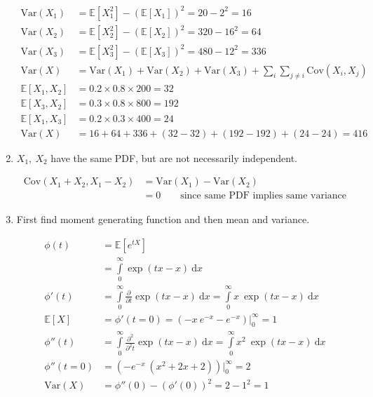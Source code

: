 \begin{enumerate}
		\begin{align}
			\mathrm{Var}(X_1) &= \mathbb{E}[X_1^2]- (\mathbb{E}[X_1])^2 = 20 - 2^2 = 16 \nonumber \\
			\mathrm{Var}(X_2) &= \mathbb{E}[X_2^2]- (\mathbb{E}[X_2])^2 = 320 - 16^2 = 64 \nonumber \\
			\mathrm{Var}(X_3) &= \mathbb{E}[X_3^2]- (\mathbb{E}[X_3])^2 = 480 - 12^2 = 336 \nonumber \\
			\mathrm{Var}(X) &= \mathrm{Var}(X_1) + \mathrm{Var}(X_2) + \mathrm{Var}(X_3) + \sum\limits_{i} \sum\limits_{j \neq i} \mathrm{Cov}(X_i, X_j)  \\
			\mathbb{E}[X_1, X_2] &= 0.2 \times 0.8 \times 200 = 32 \nonumber \\
			\mathbb{E}[X_3, X_2] &= 0.3 \times 0.8 \times 800 = 192 \nonumber \\
			\mathbb{E}[X_1, X_3] &= 0.2 \times 0.3 \times 400 = 24 \nonumber \\
			\mathrm{Var}(X) &= 16 + 64 + 336 + (32 - 32) + (192 - 192) + (24 - 24) = 416
		\end{align}
	
	
	\item $ X_1,\ X_2 $ have the same PDF, but are not necessarily independent.
	
		\begin{align}
			\mathrm{Cov}(X_1 + X_2, X_1 - X_2) &= \mathrm{Var}(X_1) - \mathrm{Var}(X_2) \nonumber \\
			&= 0 \qquad \text{since same PDF implies same variance}
		\end{align}
	
	
	\item First find moment generating function and then mean and variance.
	
		\begin{align}
			\phi (t) &= \mathbb{E}[e^{tX}] \nonumber \\
			&= \int\limits_{0}^{\infty} \exp(tx - x)\ \mathrm{d} x \nonumber \\
			\phi'(t) &=  \int\limits_{0}^{\infty} \frac{\partial}{\partial t} \exp(tx - x)\ \mathrm{d} x = \int\limits_{0}^{\infty} x\ \exp(tx - x)\ \mathrm{d} x \nonumber \\
			\mathbb{E}[X] &= \phi'(t = 0) = \left(-x\ e^{-x} - e^{-x} \right)\Big|_0^{\infty}   = 1\\
			\phi''(t) &=  \int\limits_{0}^{\infty} \frac{\partial^2}{\partial^2 t} \exp(tx - x)\ \mathrm{d} x = \int\limits_{0}^{\infty} x^2\ \exp(tx - x)\ \mathrm{d} x \nonumber \\
			\phi''(t = 0) &= \left(-e^{-x}\ (x^2 + 2x + 2) \right)\Big|_0^{\infty} = 2  \\
			\mathrm{Var}(X) &= \phi''(0) - \left(\phi'(0)\right)^2 = 2 - 1^2 = 1
		\end{align}
	

\end{enumerate}
